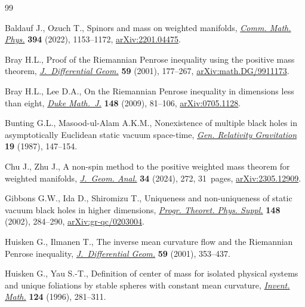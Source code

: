 \documentclass[10pt,a4paper]{amsart}
\numberwithin{equation}{section}
\theoremstyle{definition}
\begin{document}
\begin{thebibliography}{99}
\footnotesize\itemsep=0pt

Baldauf J., Ozuch T., Spinors and mass on weighted manifolds,
 \href{https://doi.org/10.1007/s00220-022-04420-y}{\textit{Comm. Math. Phys.}}
 \textbf{394} (2022), 1153--1172,
 \href{http://arxiv.org/abs/2201.04475}{arXiv:2201.04475}.

Bray H.L., Proof of the {R}iemannian {P}enrose inequality using the positive
 mass theorem,
 \href{https://doi.org/10.4310/jdg/1090349428}{\textit{J.~Differential Geom.}}
 \textbf{59} (2001), 177--267,
 \href{http://arxiv.org/abs/math.DG/9911173}{arXiv:math.DG/9911173}.

Bray H.L., Lee D.A., On the {R}iemannian {P}enrose inequality in dimensions
 less than eight,
 \href{https://doi.org/10.1215/00127094-2009-020}{\textit{Duke Math.~J.}}
 \textbf{148} (2009), 81--106,
 \href{http://arxiv.org/abs/0705.1128}{arXiv:0705.1128}.

Bunting G.L., Masood-ul-Alam A.K.M., Nonexistence of multiple black holes in
 asymptotically {E}uclidean static vacuum space-time,
 \href{https://doi.org/10.1007/BF00770326}{\textit{Gen. Relativity
 Gravitation}} \textbf{19} (1987), 147--154.

Chu J., Zhu J., A non-spin method to the positive weighted mass theorem for
 weighted manifolds,
 \href{https://doi.org/10.1007/s12220-024-01725-3}{\textit{J.~Geom. Anal.}}
 \textbf{34} (2024), 272, 31~pages,
 \href{http://arxiv.org/abs/2305.12909}{arXiv:2305.12909}.

Gibbons G.W., Ida D., Shiromizu T., Uniqueness and non-uniqueness of static
 vacuum black holes in higher dimensions, \href{https://doi.org/10.1143/PTPS.148.284}{\textit{Progr. Theoret. Phys. Suppl.}} \textbf{148} (2002), 284--290,
 \href{http://arxiv.org/abs/gr-qc/0203004}{arXiv:gr-qc/0203004}.

Huisken G., Ilmanen T., The inverse mean curvature flow and the {R}iemannian
 {P}enrose inequality,
 \href{https://doi.org/10.4310/jdg/1090349447}{\textit{J.~Differential Geom.}}
 \textbf{59} (2001), 353--437.

Huisken G., Yau S.-T., Definition of center of mass for isolated physical
 systems and unique foliations by stable spheres with constant mean curvature,
 \href{https://doi.org/10.1007/s002220050054}{\textit{Invent. Math.}}
 \textbf{124} (1996), 281--311.


\end{thebibliography}
\end{document}
